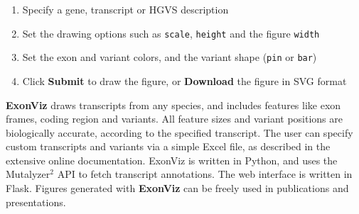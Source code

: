 \documentclass[portrait,a0paper,fontscale=0.31]{baposter}
\newcommand{\option}[1]{\texttt{#1}}
\newcommand{\exonviz}{\textbf{ExonViz} }
\newcommand{\padd}{\vspace*{0.2cm}}
\begin{document}
\begin{poster}
   {
    \padd
    \noindent
    \begin{enumerate}[leftmargin=*]
      \item Specify a gene, transcript or HGVS description
      \item Set the drawing options such as \option{scale}, \option{height} and the figure \option{width}
      \item Set the exon and variant colors, and the variant shape (\option{pin} or \option{bar})
      \item Click \textbf{Submit} to draw the figure, or \textbf{Download} the figure in SVG format
    \end{enumerate}
  }

   {
    \padd
    \noindent
    \exonviz draws transcripts from any species, and includes features
    like exon frames, coding region and variants. All feature sizes and variant
    positions are biologically accurate, according to the specified transcript.
    The user can specify custom transcripts and variants via a simple Excel
    file, as described in the extensive online documentation.
    ExonViz is written in Python, and uses the Mutalyzer$^2$ API to fetch
    transcript annotations. The web interface is written in Flask.
    \newline
    \newline
    \noindent
    Figures generated with \exonviz can be freely used in publications and
    presentations.
  }

   {
  \captionsetup{labelformat=empty,margin=0.6cm}
  }

   {
  \captionsetup{labelformat=empty,margin=0.6cm}
  }


\end{poster}
\end{document}
